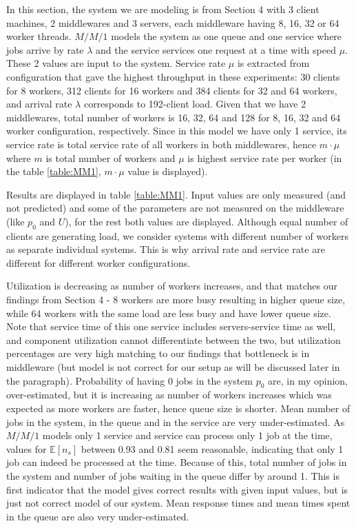 \documentclass[11pt,a4paper]{article}
\begin{document}
In this section, the system we are modeling is from Section 4 with 3 client machines, 2 middlewares and 3 servers, each middleware having 8, 16, 32 or 64 worker threads. $M/M/1$ models the system as one queue and one service where jobs arrive by rate $\lambda$ and the service services one request at a time with speed $\mu$. These 2 values are input to the system. Service rate $\mu$ is extracted from configuration that gave the highest throughput in these experiments: 30 clients for 8 workers, 312 clients for 16 workers and 384 clients for 32 and 64 workers, and arrival rate $\lambda$ corresponds to 192-client load. Given that we have 2 middlewares, total number of workers is 16, 32, 64 and 128 for 8, 16, 32 and 64 worker configuration, respectively. Since in this model we have only 1 service, its service rate is total service rate of all workers in both middlewares, hence $m\cdot\mu$ where $m$ is total number of workers and $\mu$ is highest service rate per worker (in the table \ref{table:MM1}, $m\cdot\mu$ value is displayed). 

Results are displayed in table \ref{table:MM1}. Input values are only measured (and not predicted) and some of the parameters are not measured on the middleware (like $p_0$ and $U$), for the rest both values are displayed. Although equal number of clients are generating load, we consider systems with different number of workers as separate individual systems. This is why arrival rate and service rate are different for different worker configurations.

Utilization is decreasing as number of workers increases, and that matches our findings from Section 4 - 8 workers are more busy resulting in higher queue size, while 64 workers with the same load are less busy and have lower queue size. Note that service time of this one service includes servers-service time as well, and component utilization cannot differentiate between the two, but utilization percentages are very high matching to our findings that bottleneck is in middleware (but model is not correct for our setup as will be discussed later in the paragraph). Probability of having 0 jobs in the system $p_0$ are, in my opinion, over-estimated, but it is increasing as number of workers increases which was expected as more workers are faster, hence queue size is shorter. Mean number of jobs in the system, in the queue and in the service are very under-estimated. As $M/M/1$ models only 1 service and service can process only 1 job at the time, values for $\mathbb{E}[n_s]$ between 0.93 and 0.81 seem reasonable, indicating that only 1 job can indeed be processed at the time. Because of this, total number of jobs in the system and number of jobs waiting in the queue differ by around 1. This is first indicator that the model gives correct results with given input values, but is just not correct model of our system. Mean response times and mean times spent in the queue are also very under-estimated. 
\end{document}

